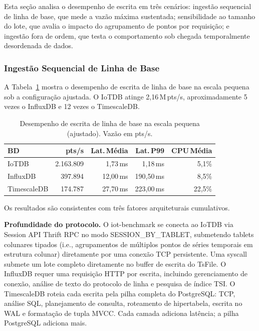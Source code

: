 Esta seção analisa o desempenho de escrita em três cenários: ingestão sequencial de linha de
base, que mede a vazão máxima sustentada; sensibilidade ao tamanho do lote, que avalia o
impacto do agrupamento de pontos por requisição; e ingestão fora de ordem, que testa o
comportamento sob chegada temporalmente desordenada de dados.

\subsubsection{Ingestão Sequencial de Linha de Base}

A Tabela~\ref{tab:write-baseline} mostra o desempenho de escrita de linha de base na escala
pequena sob a configuração ajustada. O IoTDB atinge 2,16\,M\,pts/s, aproximadamente 5 vezes
o InfluxDB e 12 vezes o TimescaleDB.

\begin{table}[t]
  \centering
  \caption{Desempenho de escrita de linha de base na escala pequena (ajustado). Vazão em pts/s.}
  \label{tab:write-baseline}
  \begin{tabular}{lrrrr}
    \hline
    \textbf{BD} & \textbf{pts/s} & \textbf{Lat.\,Média} & \textbf{Lat.\,P99} & \textbf{CPU\,Média} \\
    \hline
    IoTDB       & 2.163.809 &  1,73\,ms &   1,18\,ms &  5,1\% \\
    InfluxDB    &   397.894 & 12,00\,ms & 190,50\,ms &  8,5\% \\
    TimescaleDB &   174.787 & 27,70\,ms & 223,00\,ms & 22,5\% \\
    \hline
  \end{tabular}
\end{table}

Os resultados são consistentes com três fatores arquiteturais cumulativos.

\textbf{Profundidade do protocolo.} O iot-benchmark se conecta ao IoTDB via Session API Thrift RPC no modo SESSION\_BY\_TABLET,
submetendo tablets colunares tipados (i.e., agrupamentos de múltiplos pontos de séries temporais
em estrutura colunar) diretamente por uma conexão TCP persistente.
Uma syscall submete um lote completo diretamente no buffer de escrita do TsFile. O InfluxDB
requer uma requisição HTTP por escrita, incluindo gerenciamento de conexão, análise de texto do
protocolo de linha e pesquisa de índice TSI. O TimescaleDB roteia cada escrita pela pilha
completa do PostgreSQL: TCP, análise SQL, planejamento de consulta, roteamento de hipertabela,
escrita no WAL e formatação de tupla MVCC. Cada camada adiciona latência; a pilha PostgreSQL
adiciona mais.

